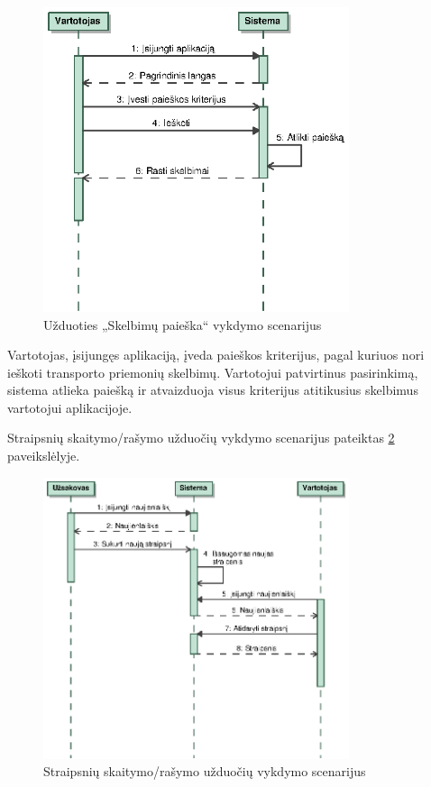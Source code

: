 \documentclass[12pt]{article}
\begin{document}
	\begin{figure}[h]
		\begin{center}
			\includegraphics[width=0.8\textwidth]{PaieskaSeka.eps}
			\caption{Užduoties „Skelbimų paieška“ vykdymo scenarijus\label{SearchScenario}}
		\end{center}
	\end{figure}
	
	Vartotojas, įsijungęs aplikaciją, įveda paieškos kriterijus, pagal kuriuos nori ieškoti transporto priemonių skelbimų. Vartotojui patvirtinus pasirinkimą, sistema atlieka paiešką ir atvaizduoja visus kriterijus atitikusius skelbimus vartotojui aplikacijoje.
	\pagebreak
	
	Straipsnių skaitymo/rašymo užduočių vykdymo scenarijus pateiktas \ref{ArticleScenario} paveikslėlyje.
	
	\begin{figure}[h]
		\begin{center}
			\includegraphics[width=0.8\textwidth]{Straipsniai.eps}
			\caption{Straipsnių skaitymo/rašymo užduočių vykdymo scenarijus\label{ArticleScenario}}
		\end{center}
	\end{figure}
	
\end{document}
